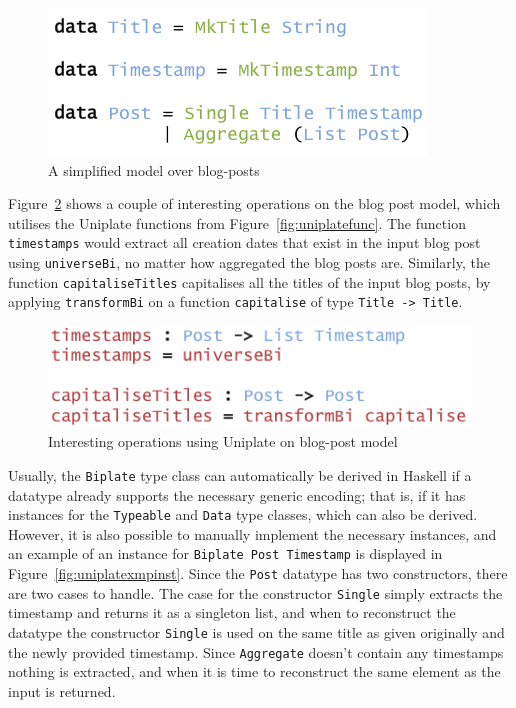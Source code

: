 \documentclass{ituthesis}
\newcommand{\ttconstructor}[1]{\textcolor{constructor-color}{\texttt{#1}}}
\newcommand{\tttype}[1]{\textcolor{type-color}{\texttt{#1}}}
\newcommand{\ttdec}[1]{\textcolor{declared-var-color}{\texttt{#1}}}
\theoremstyle{break}
\begin{document}
\begin{figure}[ht]
\begin{center}
    \includegraphics[scale=0.5]{Figures/UniplateExampleData.png}
\end{center}
\caption{A simplified model over blog-posts}
\label{fig:uniplateexmpdata}
\end{figure}

Figure~\ref{fig:uniplateexmpops} shows a couple of interesting operations on the blog post model, which utilises the Uniplate functions from Figure~\ref{fig:uniplatefunc}.
The function \ttdec{timestamps} would extract all creation dates that exist in the input blog post using \ttdec{universeBi}, no matter how aggregated the blog posts are.
Similarly, the function \ttdec{capitaliseTitles} capitalises all the titles of the input blog posts, by applying \ttdec{transformBi} on a function \ttdec{capitalise} of type \tttype{Title}\texttt{~->~}\tttype{Title}.

\begin{figure}[ht]
\begin{center}
    \includegraphics[scale=0.5]{Figures/UniplateExampleOperations.png}
\end{center}
\caption{Interesting operations using Uniplate on blog-post model}
\label{fig:uniplateexmpops}
\end{figure}

Usually, the \tttype{Biplate} type class can automatically be derived in Haskell if a datatype already supports the necessary generic encoding; that is, if it has instances for the \tttype{Typeable} and \tttype{Data} type classes, which can also be derived.
However, it is also possible to manually implement the necessary instances, and an example of an instance for \tttype{Biplate}~\tttype{Post}~\tttype{Timestamp} is displayed in Figure~\ref{fig:uniplatexmpinst}.
Since the \tttype{Post} datatype has two constructors, there are two cases to handle.
The case for the constructor \ttconstructor{Single} simply extracts the timestamp and returns it as a singleton list, and when to reconstruct the datatype the constructor \ttconstructor{Single} is used
on the same title as given originally and the newly provided timestamp.
Since \ttconstructor{Aggregate} doesn't contain any timestamps nothing is extracted, and when it is time to reconstruct the same element as the input is returned.
\end{document}

